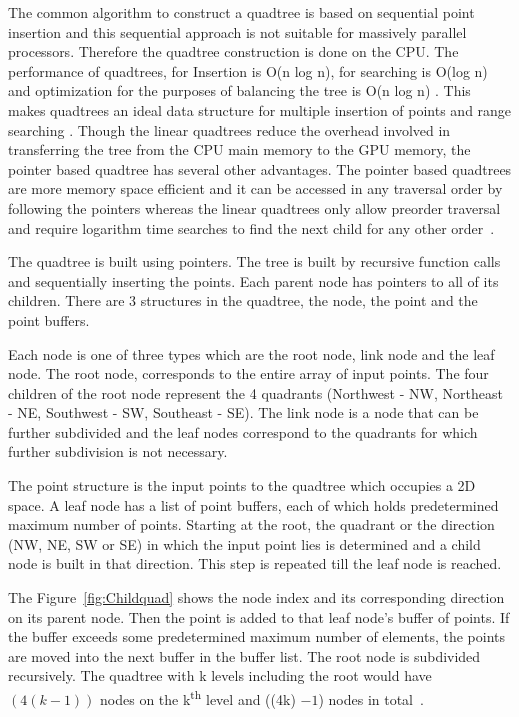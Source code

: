 The common algorithm to construct a quadtree is based on sequential
 point insertion and this sequential approach is not suitable for
 massively parallel processors. Therefore the quadtree construction is
 done on the CPU. The performance of quadtrees, for Insertion is O(n
 log n), for searching is O(log n) and optimization for the purposes
 of balancing the tree is O(n log n) \cite{Kelly:gpu}. This makes quadtrees an ideal data
 structure for multiple insertion of points and range searching \cite{Kelly:gpu}.
 Though the linear quadtrees reduce the overhead involved in
 transferring the tree from the CPU main memory to the GPU memory, the
 pointer based quadtree has several other advantages. The pointer
 based quadtrees are more memory space efficient and it can be accessed
 in any traversal order by following the pointers whereas the linear
 quadtrees only allow preorder traversal and require logarithm time
 searches to find the next child for any other order~\cite{shaff:quad}.
 
The quadtree is built using pointers.
The tree is built by recursive function calls and sequentially inserting 
the points. Each parent node has pointers to all of its children. 
There are 3 structures in the quadtree, the node, the point and the 
point buffers.

Each node is one of three types which are the root node, link node and the leaf
node. The root node, corresponds to the entire array of input
points. The four children of the root node represent the 4 quadrants 
(Northwest - NW, Northeast - NE, Southwest - SW, Southeast - SE). The
link node is a node that can be further subdivided and the leaf nodes
correspond to the quadrants for which further subdivision is not
necessary.

The point structure is the input points to the quadtree which occupies
a 2D space. A leaf node has a list of point buffers, each of which
holds predetermined maximum number of points. Starting at the root, 
the quadrant or the direction (NW, NE, SW or SE) in which the input point 
lies is determined and a child node is built in that direction. 
This step is 
repeated till the leaf node is reached. 

The Figure~\ref{fig:Childquad}
shows the node index and its corresponding direction on its parent node. 
 Then the point is added to that leaf
node's buffer of points. If the buffer exceeds some predetermined
maximum number of elements, the points are moved into the next buffer
in the buffer list. The root node is subdivided recursively. The
quadtree with k levels including the root would have ${(4(k-1))}$
nodes on the k\textsuperscript{th} level and ((4k) $-1$) nodes in total~\cite{Kelly:gpu}.

